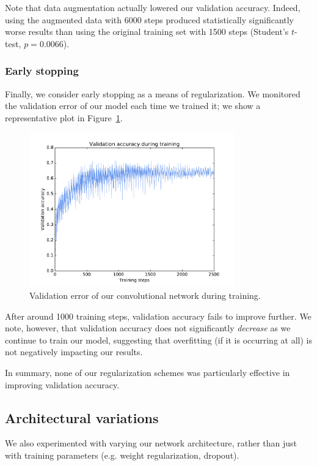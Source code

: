 \documentclass{article}
\begin{document}
\begin{multicols}{2}
Note that data augmentation actually lowered our validation accuracy.
Indeed, using the augmented data with 6000 steps
produced statistically significantly worse results
than using the original training set with 1500 steps
(Student's $t$-test, $p=0.0066$).

\subsubsection{Early stopping}

Finally, we consider early stopping as a means of regularization.
We monitored the validation error
of our model each time we trained it;
we show a representative plot in Figure~\ref{fig:2-4-4-validation-acc}.

\begin{figure}[t]
   \centering
   \includegraphics[width=3.5in]{img/2-4-4-validation-acc-new.pdf}
   \caption{Validation error of our convolutional network during training.}
   \label{fig:2-4-4-validation-acc}
\end{figure}

After around 1000 training steps,
validation accuracy fails to improve further.
We note, however, that validation accuracy
does not significantly \emph{decrease}
as we continue to train our model,
suggesting that overfitting (if it is occurring at all)
is not negatively impacting our results.

In summary, none of our regularization schemes
was particularly effective in improving validation accuracy.



\subsection{Architectural variations}

We also experimented with varying our network architecture,
rather than just with training parameters
(e.g. weight regularization, dropout).


\end{multicols}
\end{document}
